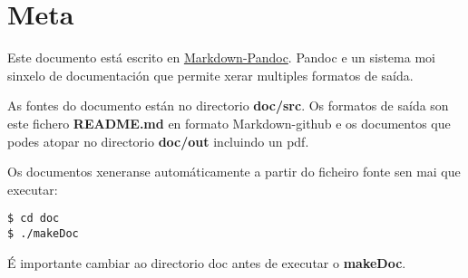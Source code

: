 \section{Meta}\label{meta}

Este documento está escrito en
\href{http://pandoc.org/README.html}{Markdown-Pandoc}. Pandoc e un
sistema moi sinxelo de documentación que permite xerar multiples
formatos de saída.

As fontes do documento están no directorio \textbf{doc/src}. Os formatos
de saída son este fichero \textbf{README.md} en formato Markdown-github
e os documentos que podes atopar no directorio \textbf{doc/out}
incluindo un pdf.

Os documentos xeneranse automáticamente a partir do ficheiro fonte sen
mai que executar:

\begin{verbatim}
$ cd doc
$ ./makeDoc
\end{verbatim}

É importante cambiar ao directorio doc antes de executar o
\textbf{makeDoc}.
